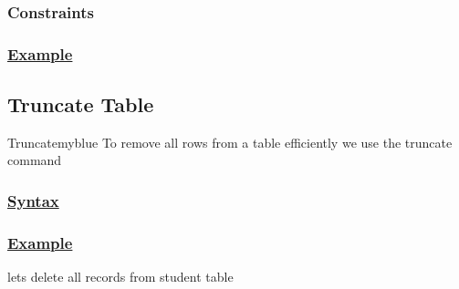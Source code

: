 

\subsubsection*{Constraints}



\subsubsection*{\underline{Example}}
\subsection{Truncate Table}
\begin{prettyBox}{Truncate}{myblue}
    To remove all rows from a table efficiently we use the truncate command
\end{prettyBox}

\subsubsection*{\underline{Syntax}}




\subsubsection*{\underline{Example}}
lets delete all records from student table



